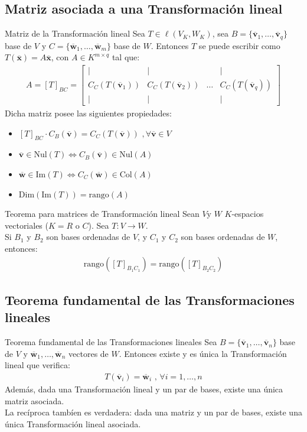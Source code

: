 \documentclass[a4paper, twoside]{article}
\numberwithin{equation}{section}
\numberwithin{figure}{section}
\numberwithin{table}{section}
\newcommand{\vect}[1]{\overline{\textbf{#1}}}
\newcommand{\col}[1]{\text{Col}(#1)}
\newcommand{\nul}[1]{\text{Nul}(#1)}
\newcommand{\im}[1]{\text{Im}(#1)}
\newcommand{\rg}[1]{\text{rango}\left(#1\right)}
\newcommand{\dime}[1]{\text{Dim}(#1)}
\begin{document}
\subsection{Matriz asociada a una Transformación lineal}
\begin{definicion*}{Matriz de la Transformación lineal}
	Sea $T \in \ell (V_K,W_K)$, sea $B=\{ \vect{v}_1,\ldots,\vect{v}_q \}$ base de $V$ y $C=\{ \vect{w}_1,\ldots,\vect{w}_m \}$ base de $W$. Entonces $T$ se puede escribir como $T(\vect{x})=A\vect{x}$, con $A \in K^{m \times q}$ tal que:
	\begin{align}
		A = [T]_{BC} =
		\begin{bmatrix}
			{|} & {|} & { } & {|} \\
			{C_C(T(\vect{v}_1))} & {C_C(T(\vect{v}_2))} & {\ldots} & {C_C(T(\vect{v}_q))} \\
			{|} & {|} & { } & {|}
		\end{bmatrix}
	\end{align}
	Dicha matriz posee las siguientes propiedades:
	\begin{itemize}
		\item $[T]_{BC} \cdot C_B(\vect{v})=C_C(T(\vect{v}))$ $,\forall \vect{v} \in V$
		\item $\vect{v} \in \nul{T} \Longleftrightarrow C_B(\vect{v}) \in \nul{A}$
		\item $\vect{w} \in \im{T} \Longleftrightarrow C_C(\vect{w}) \in \col{A}$
		\item $\dime{\im{T}}=\rg{A}$
	\end{itemize}
\end{definicion*}

\begin{teorema*}{Teorema para matrices de Transformación lineal}
	Sean $V$y $W$ $K$-espacios vectoriales ($K=R$ o $C$). Sea $T:V \to W$.\\
	
	Si $B_1$ y $B_2$ son bases ordenadas de $V$, y $C_1$ y $C_2$ son bases ordenadas de $W$, entonces:
	\begin{align}
		\rg{[T]_{B_1 C_1}}=\rg{[T]_{B_2 C_2}}
	\end{align}
\end{teorema*}

\subsection{Teorema fundamental de las Transformaciones lineales}
\begin{teorema*}{Teorema fundamental de las Transformaciones lineales}
	Sea $B=\{\vect{v}_1,\ldots,\vect{v}_n \}$ base de $V$ y $\vect{w}_1,\ldots,\vect{w}_n$ vectores de $W$. Entonces existe y es única la Transformación lineal que verifica:
	\begin{align}
		T(\vect{v}_i)=\vect{w}_i \text{ , } \forall i=1,\ldots,n
	\end{align}
	Además, dada una Transformación lineal y un par de bases, existe una única matriz asociada.\\
	
	La recíproca tambíen es verdadera: dada una matriz y un par de bases, existe una única Transformación lineal asociada.
\end{teorema*}
\end{document}
